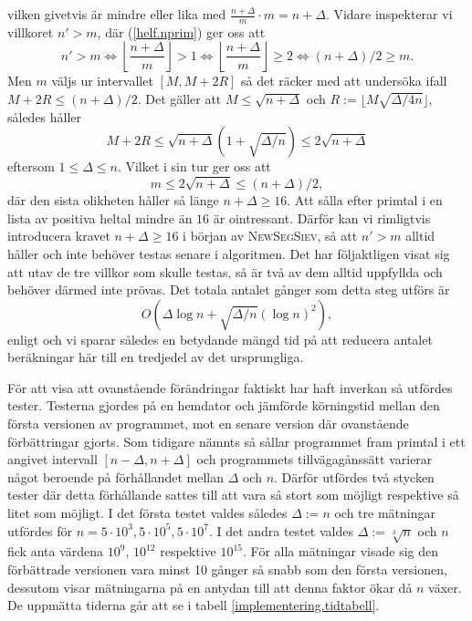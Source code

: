 vilken givetvis är mindre eller lika med $\frac{n+\Delta}{m}\cdot m = n+\Delta$. 
Vidare inspekterar vi villkoret $n'>m$, där (\ref{helf.nprim}) ger oss att 
\begin{equation*}
    n'>m \iff
    \left\lfloor \frac{n+\Delta}{m} \right\rfloor > 1 \iff
    \left\lfloor \frac{n+\Delta}{m} \right\rfloor \geq 2 \iff
    (n+\Delta)/2\geq m.
\end{equation*}
Men $m$ väljs ur intervallet $[M,M+2R]$ så det räcker med att undersöka ifall $M+2R\leq(n+\Delta)/2$. 
Det gäller att $M\leq\sqrt{n+\Delta}$ och $R:=\lfloor M\sqrt{\Delta/4n}\rfloor$,
således håller 
\begin{equation*}
    M+2R \leq
    \sqrt{n+\Delta}\left(1+ \sqrt{\Delta/n}\right) \leq 2\sqrt{n+\Delta}
\end{equation*}
eftersom $1\leq\Delta\leq n$. Vilket i sin tur ger oss att
\begin{equation*}
    m \leq 2\sqrt{n+\Delta} \leq (n+\Delta)/2,
\end{equation*}
där den sista olikheten håller så länge $n+\Delta\geq16$. 
Att sålla efter primtal i en lista av positiva heltal mindre än $16$ är ointressant.
Därför kan vi rimligtvis introducera kravet $n+\Delta\geq16$ i början av \textsc{NewSegSiev},
så att $n'>m$ alltid håller och inte behöver testas senare i algoritmen.
Det har följaktligen visat sig att utav de tre villkor som skulle testas, 
så är två av dem alltid uppfyllda och behöver därmed inte prövas.
Det totala antalet gånger som detta steg utförs är
\begin{equation*}
    O\left(\Delta\log n + \sqrt{\Delta/n}(\log n)^2\right),
\end{equation*}
enligt \cite[s.346]{HaraldSieve} och vi sparar således en betydande mängd tid på att reducera antalet beräkningar här till en tredjedel av det ursprungliga.



För att visa att ovanstående förändringar faktiskt har haft inverkan så utfördes tester.
Testerna gjordes på en hemdator och jämförde körningstid mellan den första versionen av programmet, mot en senare version där ovanstående förbättringar gjorts.
Som tidigare nämnts så sållar programmet fram primtal i ett angivet intervall $[n-\Delta,n+\Delta]$ och 
programmets tillvägagånssätt varierar något beroende på förhållandet mellan $\Delta$ och $n$.
Därför utfördes två stycken tester där detta förhållande sattes till att vara så stort som möjligt respektive så litet som möjligt.
I det första testet valdes således $\Delta:=n$ och tre mätningar utfördes för $n=5\cdot10^3,5\cdot10^5,5\cdot10^7$.
I det andra testet valdes $\Delta:=\sqrt[3]{n}$ och $n$ fick anta värdena $10^9$, $10^{12}$ respektive $10^{15}$.
För alla mätningar visade sig den förbättrade versionen vara minst 10 gånger så snabb som den första versionen, dessutom visar mätningarna på en antydan till att denna faktor ökar då $n$ växer. De uppmätta tiderna går att se i tabell \ref{implementering.tidtabell}.

